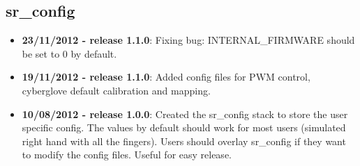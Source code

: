 
\subsection{sr\_config}
\label{sec:sr-config-changelog}

\begin{itemize}
\item \textbf{23/11/2012 - release 1.1.0}: Fixing bug: INTERNAL_FIRMWARE should be set to 0 by default.
\item \textbf{19/11/2012 - release 1.1.0}: Added config files for PWM control, cyberglove default calibration and mapping.
\item \textbf{10/08/2012 - release 1.0.0}: Created the sr\_config stack to store the user specific config. The values by default should work for most users (simulated right hand with all the fingers). Users should overlay sr\_config if they want to modify the config files. Useful for easy release.
\end{itemize}